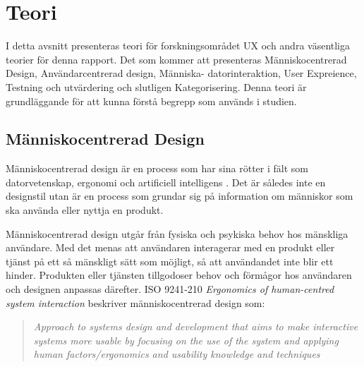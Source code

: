 
\section{Teori}
I detta avsnitt presenteras teori för forskningsområdet UX och andra väsentliga teorier för denna rapport. Det som kommer att presenteras Människocentrerad Design, Användarcentrerad design, Människa- datorinteraktion, User Expreience, Testning och utvärdering och slutligen  Kategorisering. Denna teori är grundläggande för att kunna förstå begrepp som används i studien.

\subsection{Människocentrerad Design}
Människocentrerad design är en process som har sina rötter i fält som datorvetenskap, ergonomi och artificiell intelligens \cite{Giacomin2014WhatDesign}. Det är således inte en designstil utan är en process som grundar sig på information om människor som ska använda eller nyttja en produkt\cite{Millot2014Human-CenteredDesign}. 
\newline

Människocentrerad design utgår från fysiska och psykiska behov hos mänskliga användare\cite{Millot2014Human-CenteredDesign}. Med det menas att användaren interagerar med en produkt eller tjänst på ett så mänskligt sätt som möjligt, så att användandet inte blir ett hinder. Produkten eller tjänsten tillgodoser behov och förmågor hos användaren och designen anpassas därefter\cite{Millot2014Human-CenteredDesign}.  ISO 9241-210 \textit{Ergonomics of human-centred system interaction} beskriver människocentrerad design som\cite{ISOSystems}: 
\newline

\begin{quotation}
\em{Approach to systems design and development that aims to make interactive systems more usable by focusing on the use of the system and applying human factors/ergonomics and usability knowledge and techniques}
\newline
\end{quotation}

